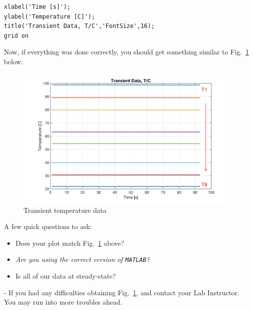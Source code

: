 \documentclass[11pt, letterpaper]{article}
\begin{document}
\n
\begin{minipage}{\linewidth}
\begin{lstlisting}[numbers=none]
% don't forget to add labels!!
xlabel('Time [s]');
ylabel('Temperature [C]');
title('Transient Data, T/C','FontSize',16);
grid on
\end{lstlisting}
\end{minipage}

\n
Now, if everything was done correctly, you should get something similar to Fig.~\ref{fig1} below.

\begin{figure}[H]
    \begin{center}
        \includegraphics[width=125mm]{gfx/fig1.png}
    \caption{Transient temperature data}\label{fig1}
    \end{center}
\end{figure}

A few quick questions to ask:

\begin{formal}
\begin{quest} 
\begin{itemize}
    \item Does your plot match Fig.~\ref{fig1} above? 
    \item \it{Are you using the correct version of \texttt{MATLAB}?} 
    \item Is all of our data at steady-state?
\end{itemize}
\end{quest}
\end{formal}
\begin{center}
\begin{tcolorbox}[enhanced, width=14cm, top=-2mm, colback=red!5, colframe=black!50!white, boxrule=0.25pt, boxsep=2mm]
\n
{\small
{} - If you had any difficulties obtaining Fig.~\ref{fig1},  and contact your Lab Instructor. You may run into more troubles ahead.
}
\end{tcolorbox}

\end{center}
\end{document}
